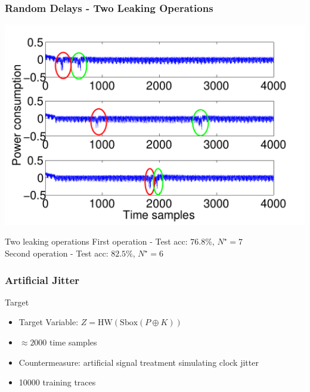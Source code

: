 \begin{frame}
\frametitle{Random Delays - Two Leaking Operations}

\centering
\includegraphics[width=.5\textwidth]{../Figures/CHES2017/CW_double_shift_traces.pdf}	


\begin{block}{Two leaking operations}
First operation - Test acc: $76.8\%$, $N^\star=7$\\
Second operation - Test acc: $82.5\%$, $N^\star=6$
\end{block}

\end{frame}

\begin{frame}
\frametitle{Artificial Jitter}
\begin{figure}
\end{figure}
\begin{block}{Target}

\begin{itemize}
\item Target Variable: $Z = \mathrm{HW}(\mathrm{Sbox}(P\oplus K))$
\item $\approx 2000$ time samples
\item Countermeasure: artificial signal treatment simulating clock jitter
\item 10000 training traces
\end{itemize}
\end{block}


\end{frame}

